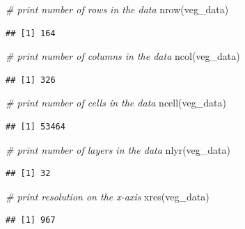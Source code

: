 \documentclass[
  12pt,
]{book}
\newenvironment{Shaded}{\begin{snugshade}}{\end{snugshade}}
\newcommand{\CommentTok}[1]{\textcolor[rgb]{0.56,0.35,0.01}{\textit{#1}}}
\newcommand{\FunctionTok}[1]{\textcolor[rgb]{0.00,0.00,0.00}{#1}}
\newcommand{\NormalTok}[1]{#1}
\begin{document}
\begin{Shaded}
\begin{Highlighting}[]
\CommentTok{\# print number of rows in the data}
\FunctionTok{nrow}\NormalTok{(veg\_data)}
\end{Highlighting}
\end{Shaded}

\begin{verbatim}
## [1] 164
\end{verbatim}

\begin{Shaded}
\begin{Highlighting}[]
\CommentTok{\# print number of columns  in the data}
\FunctionTok{ncol}\NormalTok{(veg\_data)}
\end{Highlighting}
\end{Shaded}

\begin{verbatim}
## [1] 326
\end{verbatim}

\begin{Shaded}
\begin{Highlighting}[]
\CommentTok{\# print number of cells in the data}
\FunctionTok{ncell}\NormalTok{(veg\_data)}
\end{Highlighting}
\end{Shaded}

\begin{verbatim}
## [1] 53464
\end{verbatim}

\begin{Shaded}
\begin{Highlighting}[]
\CommentTok{\# print number of layers in the data}
\FunctionTok{nlyr}\NormalTok{(veg\_data)}
\end{Highlighting}
\end{Shaded}

\begin{verbatim}
## [1] 32
\end{verbatim}

\begin{Shaded}
\begin{Highlighting}[]
\CommentTok{\# print  resolution on the x{-}axis}
\FunctionTok{xres}\NormalTok{(veg\_data)}
\end{Highlighting}
\end{Shaded}

\begin{verbatim}
## [1] 967
\end{verbatim}
\end{document}
